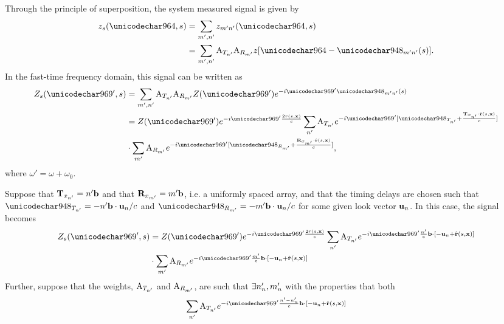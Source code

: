 Through the principle of superposition, the system measured signal is given by
\begin{equation}
\begin{split}
\pulse_{s}(\fasttime, \parm) &= \sum_{\txm,\txn}\pulse_{\txm\txn}(\fasttime, \parm)\\
&=\sum_{\txm,\txn}\txAmp{\txn}\rxAmp{\txm}\pulse[\fasttime - \mnDelay(\parm)].
\end{split}
\end{equation}
In the fast-time frequency domain, this signal can be written as
\begin{equation}
\begin{split}
\Pulse_{s}(\omega', \parm)&=\sum_{\txm,\txn}\txAmp{\txn}\rxAmp{\txm}\Pulse(\omega')\eex{-\im\omega'\mnDelay(\parm)}\\
&=\Pulse(\omega')\eex{-\im\omega'\frac{2\amplitude\range(\parm, \targetnoparm)}{c}}\sum_{\txn}\txAmp{\txn}\eex{-\im\omega'[\txDelay{\txn}+\frac{\anTx{\txn}\cdot\uRangeVectorParm}{c}]}\\
&\cdot\sum_{\txm}\rxAmp{\txm}\eex{-\im\omega'[\rxDelay{\txm}+\frac{\anRx{\txm}\cdot\uRangeVectorParm}{c}]},
\end{split}
\end{equation}
where $\omega'=\omega+\omega_0$.
\par
Suppose that $\mathbf{T}_{x_{n'}} = n'\mathbf{b}$ and that $\mathbf{R}_{x_{m'}} = m'\mathbf{b}$, i.e. a uniformly spaced array, and that the timing delays are chosen such that $\txDelay{\txn} = -\txn\bline\cdot\uzero/c$ and $\rxDelay{\txm} = -\txm\bline\cdot\uzero/c$ for some given look vector $\mathbf{u}_{n}$. In this case, the signal becomes
 \begin{equation}
 \begin{split}
  \Pulse_{s}(\omega', \parm)&=\Pulse(\omega')\eex{-\im\omega'\frac{2\amplitude\range(\parm, \targetnoparm)}{c}}\sum_{\txn}\txAmp{\txn}\eex{-\im\omega'\frac{\txn}{c}\bline\cdot[-\uzero+\uRangeVectorParm]}\\
  &\cdot\sum_{\txm}\rxAmp{\txm}\eex{-\im\omega'\frac{\txm}{c}\bline\cdot[-\uzero+\uRangeVectorParm]}
 \end{split}
 \end{equation}
Further, suppose that the weights, $\text{A}_{T_{n'}}$ and $\text{A}_{R_{m'}}$, are such that $\exists n'_{n}, m'_{n}$ with the properties that both
 \begin{equation}
  \sum_{\txn}\txAmp{\txn}\eex{-\im\omega'\frac{\txn-\txn_\channelIndex}{c}\bline\cdot[-\uzero+\uRangeVectorParm]}
 \end{equation}
